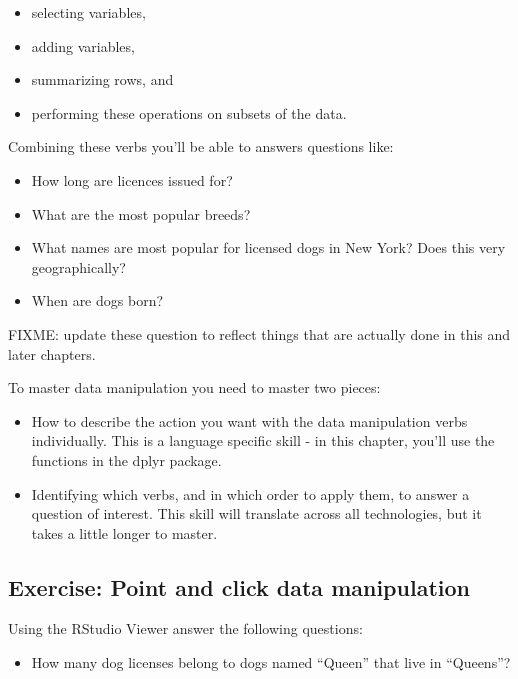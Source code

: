 \documentclass[]{Nemilov}
\providecommand{\tightlist}{%
  \setlength{\itemsep}{0pt}\setlength{\parskip}{0pt}}
\begin{document}
\begin{itemize}
\tightlist
\item
  selecting variables,
\item
  adding variables,
\item
  summarizing rows, and
\item
  performing these operations on subsets of the data.
\end{itemize}

Combining these verbs you'll be able to answers questions like:

\begin{itemize}
\item
  How long are licences issued for?
\item
  What are the most popular breeds?
\item
  What names are most popular for licensed dogs in New York? Does this very geographically?
\item
  When are dogs born?
\end{itemize}

FIXME: update these question to reflect things that are actually done in this and later chapters.

To master data manipulation you need to master two pieces:

\begin{itemize}
\item
  How to describe the action you want with the data manipulation verbs individually. This is a language specific skill - in this chapter, you'll use the functions in the dplyr package.
\item
  Identifying which verbs, and in which order to apply them, to answer a question of interest. This skill will translate across all technologies, but it takes a little longer to master.
\end{itemize}

\hypertarget{exercise-point-and-click-data-manipulation}{%
\subsection{Exercise: Point and click data manipulation}\label{exercise-point-and-click-data-manipulation}}

Using the RStudio Viewer answer the following questions:

\begin{itemize}
\tightlist
\item
  How many dog licenses belong to dogs named ``Queen'' that live in ``Queens''?
\end{itemize}
\end{document}
